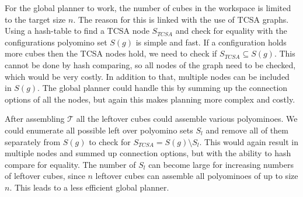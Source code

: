 For the global planner to work, the number of cubes in the workspace is limited to the target size $n$.
The reason for this is linked with the use of TCSA graphs.
Using a hash-table to find a TCSA node $S_\textit{TCSA}$ and check for equality with the configurations polyomino set $S(g)$ is simple and fast.
If a configuration holds more cubes then the TCSA nodes hold, we need to check if $S_\textit{TCSA} \subseteq S(g)$.
This cannot be done by hash comparing, so all nodes of the graph need to be checked, which would be very costly.
In addition to that, multiple nodes can be included in $S(g)$.
The global planner could handle this by summing up the connection options of all the nodes, but again this makes planning more complex and costly.

After assembling $\mathcal{T}$ all the leftover cubes could assemble various polyominoes.
We could enumerate all possible left over polyomino sets $S_l$ and remove all of them separately from $S(g)$ to check for $S_\textit{TCSA} = S(g) \setminus S_l$.
This would again result in multiple nodes and summed up connection options, but with the ability to hash compare for equality.
The number of $S_l$ can become large for increasing numbers of leftover cubes, since $n$ leftover cubes can assemble all polyominoes of up to size $n$.
This leads to a less efficient global planner.



